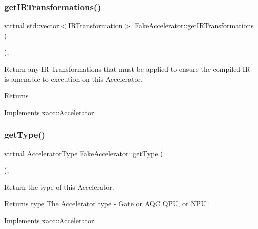 \subsubsection{\texorpdfstring{get\+I\+R\+Transformations()}{getIRTransformations()}}
{\footnotesize\ttfamily virtual std\+::vector$<$\hyperlink{a02484}{I\+R\+Transformation}$>$ Fake\+Accelerator\+::get\+I\+R\+Transformations (\begin{DoxyParamCaption}{ }\end{DoxyParamCaption})\hspace{0.3cm}{\ttfamily [inline]}, {\ttfamily [virtual]}}

Return any IR Transformations that must be applied to ensure the compiled IR is amenable to execution on this Accelerator. \begin{DoxyReturn}{Returns}

\end{DoxyReturn}


Implements \hyperlink{a02432_ad6e4a642dcb24e552675bcbeff1e1b04}{xacc\+::\+Accelerator}.

\mbox{\label{a02496_abde88dbbf4410bf1c2c3826999e32d47}} 
\subsubsection{\texorpdfstring{get\+Type()}{getType()}}
{\footnotesize\ttfamily virtual Accelerator\+Type Fake\+Accelerator\+::get\+Type (\begin{DoxyParamCaption}{ }\end{DoxyParamCaption})\hspace{0.3cm}{\ttfamily [inline]}, {\ttfamily [virtual]}}

Return the type of this Accelerator.

\begin{DoxyReturn}{Returns}
type The Accelerator type -\/ Gate or A\+QC Q\+PU, or N\+PU 
\end{DoxyReturn}


Implements \hyperlink{a02432_aaffc3e4bb9880eb5041b1b58ee4c2665}{xacc\+::\+Accelerator}.

\mbox{\label{a02496_a7a6e63d282dc38fc53c3f3d46ca2ba9b}} 
